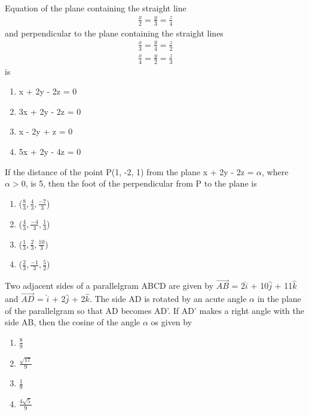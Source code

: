 \item Equation of the plane containing the straight line 
\begin{align*}
\frac{x}{2} = \frac{y}{3} = \frac{z}{4}
\end{align*}
and perpendicular to the plane containing the straight lines 
\begin{align*}
\frac{x}{3} = \frac{y}{4} = \frac{z}{2} 
\end{align*}
\begin{align*}
\frac{x}{4} = \frac{y}{2} = \frac{z}{3}
\end{align*}
is
\begin{enumerate}
\item x + 2y - 2z = 0
\item 3x + 2y - 2z = 0
\item x - 2y + z = 0
\item 5x + 2y - 4z = 0
\end{enumerate}

\item If the distance of the point P(1, -2, 1) from the plane x + 2y - 2z = $\alpha$, where $\alpha > 0$, is 5, then the foot of the perpendicular from P to the plane is
\begin{enumerate}
\item ($\frac{8}{3}, \frac{4}{3}, \frac{-7}{3}$)
\item ($\frac{4}{3}, \frac{-4}{3}, \frac{1}{3}$)
\item ($\frac{1}{3}, \frac{2}{3}, \frac{10}{3}$)
\item ($\frac{2}{3}, \frac{-1}{3}, \frac{5}{2}$)
\end{enumerate}

\item Two adjacent sides of a parallelgram ABCD are given by $\overrightarrow{AB}$ = 2$\hat{i}$ + 10$\hat{j}$ + 11$\hat{k}$ and $\overrightarrow{AD}$ = $\hat{i}$ + 2$\hat{j}$ + 2$\hat{k}$. The side AD is rotated by an acute angle $\alpha$ in the plane of the parallelgram so that AD becomes AD'. If AD' makes a right angle with the side AB, then the cosine of the angle $\alpha$ os given by
\begin{enumerate}
\item $\frac{8}{9}$
\item $\frac{\sqrt{17}}{9}$
\item $\frac{1}{9}$
\item $\frac{4\sqrt{5}}{9}$
\end{enumerate}

